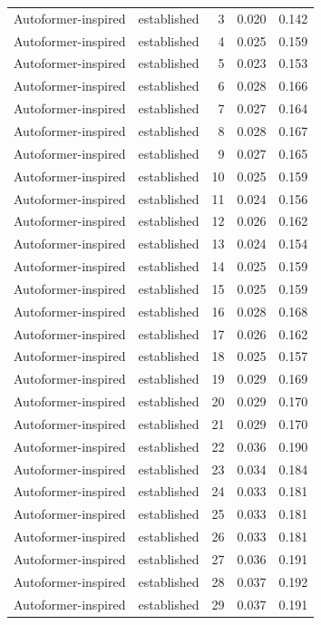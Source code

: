 \begin{tabular}{llrrr}
Autoformer-inspired & established & 3 & 0.020 & 0.142 \\
Autoformer-inspired & established & 4 & 0.025 & 0.159 \\
Autoformer-inspired & established & 5 & 0.023 & 0.153 \\
Autoformer-inspired & established & 6 & 0.028 & 0.166 \\
Autoformer-inspired & established & 7 & 0.027 & 0.164 \\
Autoformer-inspired & established & 8 & 0.028 & 0.167 \\
Autoformer-inspired & established & 9 & 0.027 & 0.165 \\
Autoformer-inspired & established & 10 & 0.025 & 0.159 \\
Autoformer-inspired & established & 11 & 0.024 & 0.156 \\
Autoformer-inspired & established & 12 & 0.026 & 0.162 \\
Autoformer-inspired & established & 13 & 0.024 & 0.154 \\
Autoformer-inspired & established & 14 & 0.025 & 0.159 \\
Autoformer-inspired & established & 15 & 0.025 & 0.159 \\
Autoformer-inspired & established & 16 & 0.028 & 0.168 \\
Autoformer-inspired & established & 17 & 0.026 & 0.162 \\
Autoformer-inspired & established & 18 & 0.025 & 0.157 \\
Autoformer-inspired & established & 19 & 0.029 & 0.169 \\
Autoformer-inspired & established & 20 & 0.029 & 0.170 \\
Autoformer-inspired & established & 21 & 0.029 & 0.170 \\
Autoformer-inspired & established & 22 & 0.036 & 0.190 \\
Autoformer-inspired & established & 23 & 0.034 & 0.184 \\
Autoformer-inspired & established & 24 & 0.033 & 0.181 \\
Autoformer-inspired & established & 25 & 0.033 & 0.181 \\
Autoformer-inspired & established & 26 & 0.033 & 0.181 \\
Autoformer-inspired & established & 27 & 0.036 & 0.191 \\
Autoformer-inspired & established & 28 & 0.037 & 0.192 \\
Autoformer-inspired & established & 29 & 0.037 & 0.191 \\

\end{tabular}
